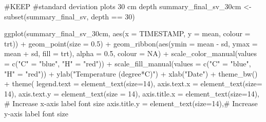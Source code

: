 \documentclass[
  letterpaper,
  DIV=11,
  numbers=noendperiod]{scrartcl}
\newenvironment{Shaded}{\begin{snugshade}}{\end{snugshade}}
\newcommand{\AttributeTok}[1]{\textcolor[rgb]{0.40,0.45,0.13}{#1}}
\newcommand{\CommentTok}[1]{\textcolor[rgb]{0.37,0.37,0.37}{#1}}
\newcommand{\ConstantTok}[1]{\textcolor[rgb]{0.56,0.35,0.01}{#1}}
\newcommand{\DecValTok}[1]{\textcolor[rgb]{0.68,0.00,0.00}{#1}}
\newcommand{\FloatTok}[1]{\textcolor[rgb]{0.68,0.00,0.00}{#1}}
\newcommand{\FunctionTok}[1]{\textcolor[rgb]{0.28,0.35,0.67}{#1}}
\newcommand{\NormalTok}[1]{\textcolor[rgb]{0.00,0.23,0.31}{#1}}
\newcommand{\OtherTok}[1]{\textcolor[rgb]{0.00,0.23,0.31}{#1}}
\newcommand{\SpecialCharTok}[1]{\textcolor[rgb]{0.37,0.37,0.37}{#1}}
\newcommand{\StringTok}[1]{\textcolor[rgb]{0.13,0.47,0.30}{#1}}
\begin{document}
\begin{Shaded}
\begin{Highlighting}[]
\CommentTok{\#KEEP }
\CommentTok{\#standard deviation plots 30 cm depth}
\NormalTok{summary\_final\_sv\_30cm }\OtherTok{\textless{}{-}} \FunctionTok{subset}\NormalTok{(summary\_final\_sv, depth }\SpecialCharTok{==} \StringTok{\textquotesingle{}30\textquotesingle{}}\NormalTok{)}

\FunctionTok{ggplot}\NormalTok{(summary\_final\_sv\_30cm, }\FunctionTok{aes}\NormalTok{(}\AttributeTok{x =}\NormalTok{ TIMESTAMP, }\AttributeTok{y =}\NormalTok{ mean, }\AttributeTok{colour =}\NormalTok{ trt)) }\SpecialCharTok{+}
  \FunctionTok{geom\_point}\NormalTok{(}\AttributeTok{size =} \FloatTok{0.5}\NormalTok{) }\SpecialCharTok{+}
  \FunctionTok{geom\_ribbon}\NormalTok{(}\FunctionTok{aes}\NormalTok{(}\AttributeTok{ymin =}\NormalTok{ mean }\SpecialCharTok{{-}}\NormalTok{ sd, }\AttributeTok{ymax =}\NormalTok{ mean }\SpecialCharTok{+}\NormalTok{ sd, }\AttributeTok{fill =}\NormalTok{ trt), }\AttributeTok{alpha =} \FloatTok{0.5}\NormalTok{, }\AttributeTok{colour =} \ConstantTok{NA}\NormalTok{) }\SpecialCharTok{+}
  \FunctionTok{scale\_color\_manual}\NormalTok{(}\AttributeTok{values =} \FunctionTok{c}\NormalTok{(}\StringTok{"C"} \OtherTok{=} \StringTok{"blue"}\NormalTok{, }\StringTok{"H"} \OtherTok{=} \StringTok{"red"}\NormalTok{)) }\SpecialCharTok{+}
  \FunctionTok{scale\_fill\_manual}\NormalTok{(}\AttributeTok{values =} \FunctionTok{c}\NormalTok{(}\StringTok{"C"} \OtherTok{=} \StringTok{"blue"}\NormalTok{, }\StringTok{"H"} \OtherTok{=} \StringTok{"red"}\NormalTok{)) }\SpecialCharTok{+}
  \FunctionTok{ylab}\NormalTok{(}\StringTok{"Temperature (degree*C)"}\NormalTok{) }\SpecialCharTok{+}
  \FunctionTok{xlab}\NormalTok{(}\StringTok{"Date"}\NormalTok{) }\SpecialCharTok{+}
  \FunctionTok{theme\_bw}\NormalTok{() }\SpecialCharTok{+}
  \FunctionTok{theme}\NormalTok{(}
    \AttributeTok{legend.text =} \FunctionTok{element\_text}\NormalTok{(}\AttributeTok{size=}\DecValTok{14}\NormalTok{),}
    \AttributeTok{axis.text.x =} \FunctionTok{element\_text}\NormalTok{(}\AttributeTok{size=} \DecValTok{14}\NormalTok{),}
    \AttributeTok{axis.text.y =} \FunctionTok{element\_text}\NormalTok{(}\AttributeTok{size =} \DecValTok{14}\NormalTok{),}
    \AttributeTok{axis.title.x =} \FunctionTok{element\_text}\NormalTok{(}\AttributeTok{size=}\DecValTok{14}\NormalTok{),  }\CommentTok{\# Increase x{-}axis label font size}
    \AttributeTok{axis.title.y =} \FunctionTok{element\_text}\NormalTok{(}\AttributeTok{size=}\DecValTok{14}\NormalTok{),}\CommentTok{\# Increase y{-}axis label font size}

\end{Highlighting}
\end{Shaded}
\end{document}
